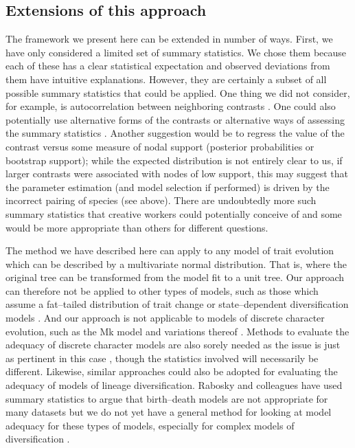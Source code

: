 \documentclass[a4paper,12pt]{article}
\begin{document}
\subsection*{Extensions of this approach}
The framework we present here can be extended in number of ways. First, we have only considered a limited set of summary statistics. We chose them because each of these has a clear statistical expectation and observed deviations from them have intuitive explanations. However, they are certainly a subset of all possible summary statistics that could be applied. One thing we did not consider, for example, is autocorrelation between neighboring contrasts \citep[see][]{Cheverud1985, Gittleman1990}. One could also potentially use alternative forms of the contrasts \citep[such as contrasts considering within species variation][]{Felsenstein2008} or alternative ways of assessing the summary statistics \citep[e.g. using robust regression in lieu of fitting standard linear models for the 3 summary statistics involving slope; see][]{SlaterPennell}. Another suggestion would be to regress the value of the contrast versus some measure of nodal support (posterior probabilities or bootstrap support); while the expected distribution is not entirely clear to us, if larger contrasts were associated with nodes of low support, this may suggest that the parameter estimation (and model selection if performed) is driven by the incorrect pairing of species (see above). There are undoubtedly more such summary statistics that creative workers could potentially conceive of and some would be more appropriate than others for different questions.

The method we have described here can apply to any model of trait evolution which can be described by a multivariate normal distribution. That is, where the original tree can be transformed from the model fit to a unit tree. Our approach can therefore not be applied to other types of models, such as those which assume a fat--tailed distribution of trait change \citep[e.g.][]{Landis2012} or state--dependent diversification models \citep[e.g.][]{Bokma2008, FitzJohn2010}. And our approach is not applicable to models of discrete character evolution, such as the Mk model \citep{Pagel1994, Lewis2001} and variations thereof \citep[e.g.][]{Maddison2007, WagnerMarcot2010, Marazzi2012, Beaulieu2013} \citep[also see Felsenstein's threshold model;][]{Felsenstein2005, Felsenstein2012}. Methods to evaluate the adequacy of discrete character models are also sorely needed as the issue is just as pertinent in this case \citep{ReadNee1995}, though the statistics involved will necessarily be different. Likewise, similar approaches could also be adopted for evaluating the adequacy of models of lineage diversification. Rabosky and colleagues \citep[e.g.][]{Rabosky2009AmNat, Rabosky2012} have used summary statistics to argue that birth--death models \citep[sensu][]{Nee1992} are not appropriate for many datasets but we do not yet have a general method for looking at model adequacy for these types of models, especially for complex models of diversification \citep[e.g.][]{Stadler2011, Etienne2012}.
\end{document}
